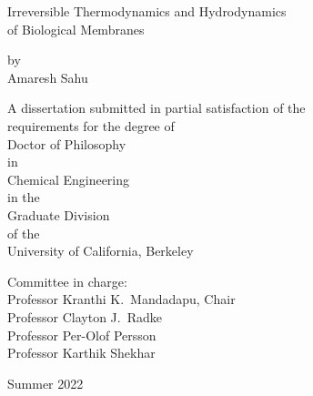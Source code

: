 


\vspace*{1.2cm}
\begin{center}
	\normalsize

	Irreversible Thermodynamics and Hydrodynamics\\[3pt]of Biological Membranes

	\vspace{0.4cm}
	{
		by\\[9pt]
		Amaresh Sahu
	}

	\vspace{2.2cm}
	{
		A dissertation submitted in partial satisfaction of the\\[4pt]
		requirements for the degree of\\[4pt]
		Doctor of Philosophy\\[7pt]
		in\\[7pt]
		Chemical Engineering\\[7pt]
		in the\\[7pt]
		Graduate Division\\[7pt]
		of the\\[7pt]
		University of California, Berkeley
	}

	\vspace{2.2cm}
	{
		Committee in charge:\\[4pt]
		Professor Kranthi K.\ Mandadapu, Chair\\[2pt]
		Professor Clayton J.\ Radke
		\\[2pt]
		Professor Per-Olof Persson
		\\[2pt]
		Professor Karthik Shekhar%
	}

	\vspace{1.4cm}
	{
		Summer 2022
	}

\end{center}



